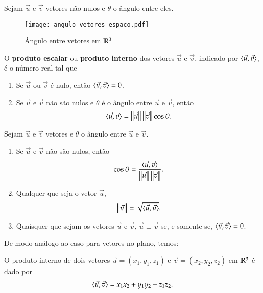 Sejam $\vec{u}$ e $\vec{v}$ vetores n\~ao nulos e $\theta$ o \^angulo entre eles.
\begin{figure}[!h]
  \centering
  \caption{\^Angulo entre vetores em $\mathbb{R}^3$}
  \texttt{[image: angulo-vetores-espaco.pdf]}


\end{figure}


\begin{definicao}\label{produtointerno-espaco}
  O \textbf{produto escalar} ou \textbf{produto interno} dos vetores $\vec{u}$ e $\vec{v}$, indicado por $\langle \vec{u}, \vec{v} \rangle$, \'e o n\'umero real tal que
  \begin{enumerate}
    \item Se $\vec{u}$ ou $\vec{v}$ \'e nulo, ent\~ao $\langle \vec{u}, \vec{v} \rangle = 0$.
    \item Se $\vec{u}$ e $\vec{v}$ n\~ao s\~ao nulos e $\theta$ \'e o \^angulo entre $\vec{u}$ e $\vec{v}$, ent\~ao
    \begin{align}\label{produto-interno-espaco}
      \langle \vec{u}, \vec{v} \rangle = \left\Vert{\vec{u}}\right\Vert\left\Vert{\vec{v}}\right\Vert\cos\theta.
    \end{align}
  \end{enumerate}
\end{definicao}

\begin{proposicao}
  Sejam $\vec{u}$ e $\vec{v}$ vetores e $\theta$ o \^angulo entre $\vec{u}$ e $\vec{v}$.
  \begin{enumerate}
    \item Se $\vec{u}$ e $\vec{v}$ n\~ao s\~ao nulos, ent\~ao
    \[
      \cos\theta = \dfrac{\langle \vec{u}, \vec{v} \rangle}{\left\Vert{\vec{u}}\right\Vert\left\Vert{\vec{v}}\right\Vert}.
    \]
    \item Qualquer que seja o vetor $\vec{u}$,
    \[
      \left\Vert{\vec{u}}\right\Vert = \sqrt{\langle \vec{u}, \vec{u} \rangle}.
    \]
    \item Quaisquer que sejam os vetores $\vec{u}$ e $\vec{v}$, $\vec{u}\perp\vec{v}$ se, e somente se, $\langle \vec{u}, \vec{v} \rangle = 0$.
    \end{enumerate}
\end{proposicao}
De modo an\'alogo ao caso para vetores no plano, temos:
\begin{teorema}
  O produto interno de dois vetores $\vec{u} = (x_1, y_1,z_1)$ e $\vec{v} = (x_2, y_2,z_2)$ em $\mathbb{R}^3$ \'e dado por
  \[
    \langle \vec{u}, \vec{v} \rangle = x_1x_2 + y_1y_2 + z_1z_2.
  \]
\end{teorema}

